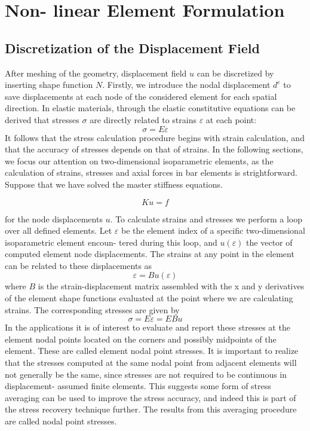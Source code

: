 \section{Non- linear Element Formulation}
\subsection{Discretization of the Displacement Field}
After meshing of the geometry, displacement field $u$ can be discretized by inserting shape function $N$. Firstly, we introduce the nodal displacement $d^e$ to save displacements at each node of the considered element for each spatial direction. In elastic materials, through the elastic constitutive equations can be derived that stresses $\sigma$ are directly related to strains $\varepsilon$ at each point:
\begin{equation}
\sigma = E\varepsilon
\end{equation}
It follows that the stress calculation procedure begins with strain calculation, and that the accuracy of stresses depends on that of strains. In the following sections, we focus our attention on two-dimensional isoparametric elements, as the calculation of strains, stresses and axial forces in bar elements is strightforward. Suppose that we have solved the master stiffness equations. 


	\begin{equation}
	Ku = f
	\end{equation}


for the node displacements $u$. To calculate strains and stresses we perform a loop over all defined elements. Let $\varepsilon$ be the element index of a specific two-dimensional isoparametric element encoun- tered during this loop, and $u(\varepsilon)$ the vector of computed element node displacements. The strains at any point in the element can be related to these displacements as 
\begin{equation}
\varepsilon = Bu(\varepsilon) 
\end{equation}
where $B$ is the strain-displacement matrix assembled with the x and y derivatives of the element shape functions evaluated at the point where we are calculating strains. The corresponding stresses are given by 
\begin{equation}
\sigma = E\varepsilon = EBu 
\end{equation}
In the applications it is of interest to evaluate and report these stresses at the element nodal points located on the corners and possibly midpoints of the element. These are called element nodal point stresses.
It is important to realize that the stresses computed at the same nodal point from adjacent elements will not generally be the same, since stresses are not required to be continuous in displacement- assumed finite elements. This suggests some form of stress averaging can be used to improve the stress accuracy, and indeed this is part of the stress recovery technique further. The results from this averaging procedure are called nodal point stresses.


